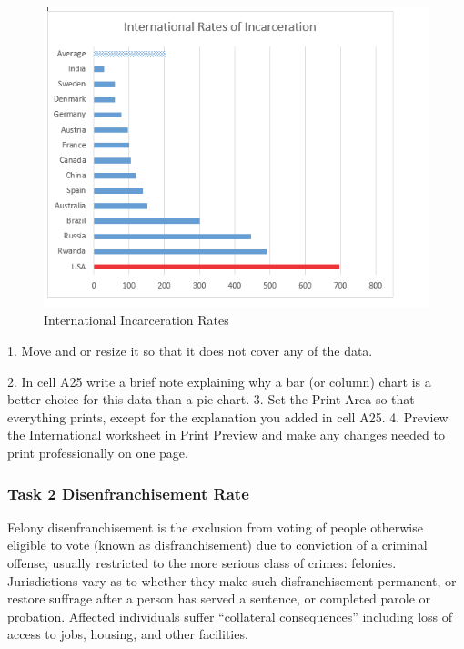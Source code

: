 \begin{figure}[H]
	\centering
	\includegraphics[width=\maxwidth{.95\linewidth}]{gfx/ch04_fig55}
	\caption{International Incarceration Rates}
	\label{04:fig55}
\end{figure}



1. Move and or resize it so that it does not cover any of the data.



2. In cell A25 write a brief note explaining why a bar (or column) chart is a better choice for this
data than a pie chart.
3. Set the Print Area so that everything prints, except for the explanation you added in cell A25.
4. Preview the International worksheet in Print Preview and make any changes needed to print
professionally on one page.

\subsubsection{Task 2 Disenfranchisement Rate}

Felony disenfranchisement is the exclusion from voting of people otherwise eligible to vote (known
as disfranchisement) due to conviction of a criminal offense, usually restricted to the more serious
class of crimes: felonies. Jurisdictions vary as to whether they make such disfranchisement permanent,
or restore suffrage after a person has served a sentence, or completed parole or probation. Affected
individuals suffer “collateral consequences” including loss of access to jobs, housing, and other
facilities.

